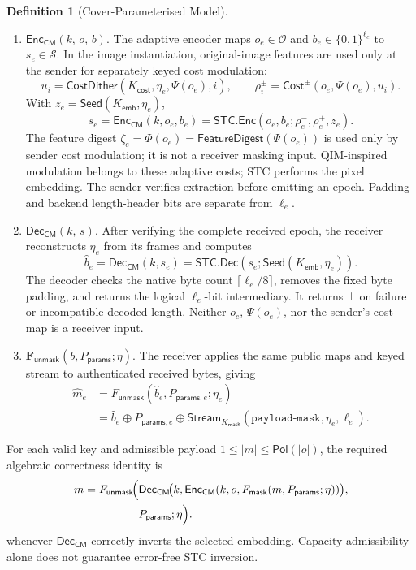 \documentclass[pdflatex,sn-mathphys-num]{sn-jnl}%
\theoremstyle{definition}
\newtheorem{definition}{Definition}[section]
\theoremstyle{game}
\theoremstyle{thmstyleone}%
\theoremstyle{thmstyletwo}%
\theoremstyle{thmstylethree}%
\begin{document}
\begin{definition}[Cover-Parameterised Model]
\begin{enumerate}[label=(\Alph*),leftmargin=2em]
\item $\boldsymbol{\mathsf{Enc}_{\mathsf{CM}}}(k,\,o,\,b)$.
The adaptive encoder maps $o_e\in\mathcal O$ and $b_e\in\{0,1\}^{\ell_e}$
to $s_e\in\mathcal S$. In the image instantiation, original-image features
are used only at the sender for separately keyed cost modulation:
\[
u_i=\mathsf{CostDither}(K_{\mathsf{cost}},\eta_e,\Psi(o_e),i),\qquad
\rho_i^\pm=\mathsf{Cost}^{\pm}(o_e,\Psi(o_e),u_i).
\]
With $z_e=\mathsf{Seed}(K_{\mathsf{emb}},\eta_e)$,
\[
s_e=\mathsf{Enc}_{\mathsf{CM}}(k,o_e,b_e)
=\mathsf{STC.Enc}(o_e,b_e;\rho_e^-,\rho_e^+,z_e).
\]
The feature digest $\zeta_e=\Phi(o_e)=\mathsf{FeatureDigest}(\Psi(o_e))$
is used only by sender cost modulation; it is not a receiver masking input. QIM-inspired modulation belongs to these adaptive costs; STC performs the
pixel embedding. The sender verifies extraction before emitting an epoch.
Padding and backend length-header bits are separate from $\ell_e$.

\item $\boldsymbol{\mathsf{Dec}_{\mathsf{CM}}}(k,\,s)$.
After verifying the complete received epoch, the receiver reconstructs
$\eta_e$ from its frames and computes
\[
\widehat b_e=\mathsf{Dec}_{\mathsf{CM}}(k,s_e)
=\mathsf{STC.Dec}(s_e;\mathsf{Seed}(K_{\mathsf{emb}},\eta_e)).
\]
The decoder checks the native byte count $\lceil\ell_e/8\rceil$, removes the fixed byte padding, and returns the logical $\ell_e$-bit intermediary. It returns $\bot$ on failure or incompatible decoded length.
Neither $o_e$, $\Psi(o_e)$, nor the sender's cost map is a receiver input.

\item $\boldsymbol{F_{\mathsf{unmask}}}(b,P_{\mathsf{params}};\eta)$.
The receiver applies the same public maps and keyed stream to authenticated
received bytes, giving
\begin{equation}\label{eq:qim_unmask}
\begin{aligned}
\widehat m_e
 &=F_{\mathsf{unmask}}(\widehat b_e,P_{\mathsf{params},e};\eta_e)\\
 &=\widehat b_e\oplus P_{\mathsf{params},e}\oplus
 \mathsf{Stream}_{K_{\mathsf{mask}}}(\texttt{payload-mask},\eta_e,\ell_e).
\end{aligned}
\end{equation}
\end{enumerate}
For each valid key and admissible payload $1\le|m|\le\mathsf{Pol}(|o|)$, the
required algebraic correctness identity is
\[
\begin{aligned}
m=F_{\mathsf{unmask}}\!\Bigl(
 &\mathsf{Dec}_{\mathsf{CM}}\!\bigl(k,
 \mathsf{Enc}_{\mathsf{CM}}(k,o,F_{\mathsf{mask}}(m,P_{\mathsf{params}};\eta))\bigr),\\
 &P_{\mathsf{params}};\eta\Bigr).
\end{aligned}
\]
whenever $\mathsf{Dec}_{\mathsf{CM}}$ correctly inverts the selected embedding.
Capacity admissibility alone does not guarantee error-free STC inversion.
\end{definition}
\end{document}
